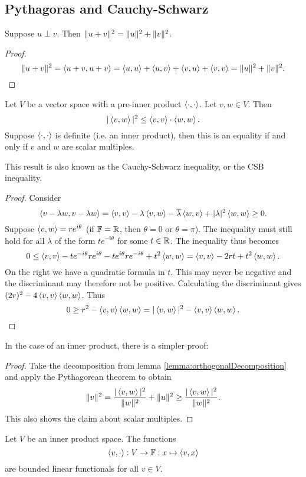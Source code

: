 \subsection{Pythagoras and Cauchy-Schwarz}
\begin{theorem}
Suppose $u\perp v$. Then $\lVert u+v\rVert^2 = \lVert u\rVert^2 + \lVert v\rVert^2$.
\end{theorem}
\begin{proof}
\[ \lVert u+v\rVert^2 = \left\langle u+v,u+v \right\rangle = \left\langle u,u \right\rangle+ \left\langle u,v \right\rangle + \left\langle v,u \right\rangle + \left\langle v,v \right\rangle = \lVert u\rVert^2 + \lVert v\rVert^2. \]
\end{proof}

\begin{theorem} \label{theorem:CauchySchwarz}
Let $V$ be a vector space with a pre-inner product $\left\langle \cdot,\cdot \right\rangle$. Let $v,w\in V$. Then
\[ |\left\langle v,w \right\rangle|^2\leq \left\langle v,v \right\rangle\cdot\left\langle w,w \right\rangle. \]
Suppose $\left\langle \cdot,\cdot \right\rangle$ is definite (i.e. an inner product), then
this is an equality \textup{if and only if} $v$ and $w$ are scalar multiples.
\end{theorem}
This result is also known as the Cauchy-Schwarz inequality, or the CSB inequality.
\begin{proof}
Consider 
\[ \left\langle v-\lambda w, v-\lambda w \right\rangle = \left\langle v,v \right\rangle-\lambda\left\langle v,w \right\rangle-\overline{\lambda}\left\langle w,v \right\rangle + |\lambda|^2 \left\langle w,w \right\rangle \geq 0. \]
Suppose $\left\langle v,w \right\rangle=re^{i\theta}$ (if $\mathbb{F} = \mathbb{R}$, then $\theta=0$ or $\theta = \pi$). The inequality must still hold for all $\lambda$ of the form $te^{-i\theta}$ for some $t\in \mathbb{R}$. The inequality thus becomes
\[ 0\leq \left\langle v,v \right\rangle-te^{-i\theta}re^{i\theta}-te^{i\theta}re^{-i\theta} + t^2 \left\langle w,w \right\rangle = \left\langle v,v \right\rangle-2rt + t^2 \left\langle w,w \right\rangle. \]
On the right we have a quadratic formula in $t$. This may never be negative and the discriminant may therefore not be positive. Calculating the discriminant gives $(2r)^2 - 4\left\langle v,v \right\rangle\left\langle w,w \right\rangle$. Thus
\[ 0\geq r^2 - \left\langle v,v \right\rangle\left\langle w,w \right\rangle = |\left\langle v,w \right\rangle|^2 - \left\langle v,v \right\rangle\left\langle w,w \right\rangle. \]
\end{proof}
In the case of an inner product, there is a simpler proof:
\begin{proof}
Take the decomposition from lemma \ref{lemma:orthogonalDecomposition} and apply the Pythagorean theorem to obtain
\[ \lVert v\rVert^2 = \frac{|\left\langle v,w \right\rangle|^2}{\lVert w\rVert^2} + \lVert u\rVert^2 \geq \frac{|\left\langle v,w \right\rangle|^2}{\lVert w\rVert^2}. \]
This also shows the claim about scalar multiples.
\end{proof}
\begin{corollary} \label{lemma:innerBoundedFunctionals}
Let $V$ be an inner product space. The functions
\[\left\langle v,\cdot \right\rangle: V\to \mathbb{F}: x\mapsto \left\langle v,x \right\rangle \]
are bounded linear functionals for all $v\in V$.
\end{corollary}

